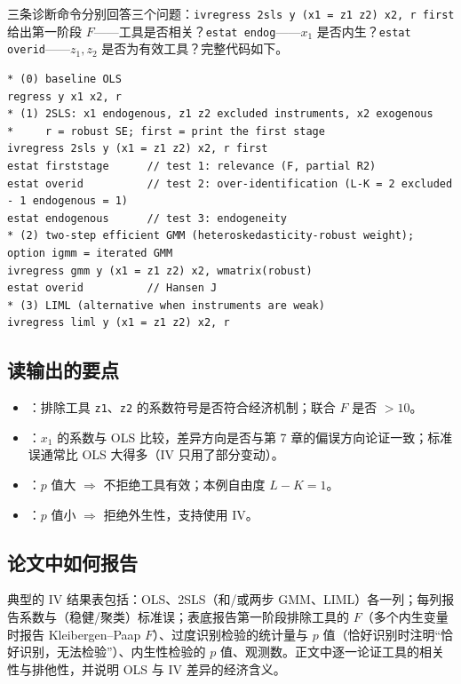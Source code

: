 三条诊断命令分别回答三个问题：\texttt{ivregress 2sls y (x1 = z1 z2) x2, r first} 给出第一阶段 $F$——工具是否相关？\texttt{estat endog}——$x_1$ 是否内生？\texttt{estat overid}——$z_1,z_2$ 是否为有效工具？完整代码如下。
\begin{lstlisting}
* (0) baseline OLS
regress y x1 x2, r
* (1) 2SLS: x1 endogenous, z1 z2 excluded instruments, x2 exogenous
*     r = robust SE; first = print the first stage
ivregress 2sls y (x1 = z1 z2) x2, r first
estat firststage      // test 1: relevance (F, partial R2)
estat overid          // test 2: over-identification (L-K = 2 excluded - 1 endogenous = 1)
estat endogenous      // test 3: endogeneity
* (2) two-step efficient GMM (heteroskedasticity-robust weight); option igmm = iterated GMM
ivregress gmm y (x1 = z1 z2) x2, wmatrix(robust)
estat overid          // Hansen J
* (3) LIML (alternative when instruments are weak)
ivregress liml y (x1 = z1 z2) x2, r
\end{lstlisting}

\subsection{读输出的要点}

\begin{itemize}
  \item {}：排除工具 \texttt{z1}、\texttt{z2} 的系数符号是否符合经济机制；联合 $F$ 是否 $>10$。
  \item {}：$x_1$ 的系数与 OLS 比较，差异方向是否与第 7 章的偏误方向论证一致；标准误通常比 OLS 大得多（IV 只用了部分变动）。
  \item {}：$p$ 值大 $\Rightarrow$ 不拒绝工具有效；本例自由度 $L-K=1$。
  \item {}：$p$ 值小 $\Rightarrow$ 拒绝外生性，支持使用 IV。
\end{itemize}

\subsection{论文中如何报告}

典型的 IV 结果表包括：OLS、2SLS（和/或两步 GMM、LIML）各一列；每列报告系数与（稳健/聚类）标准误；表底报告第一阶段排除工具的 $F$（多个内生变量时报告 Kleibergen--Paap $F$）、过度识别检验的统计量与 $p$ 值（恰好识别时注明“恰好识别，无法检验”）、内生性检验的 $p$ 值、观测数。正文中逐一论证工具的相关性与排他性，并说明 OLS 与 IV 差异的经济含义。

